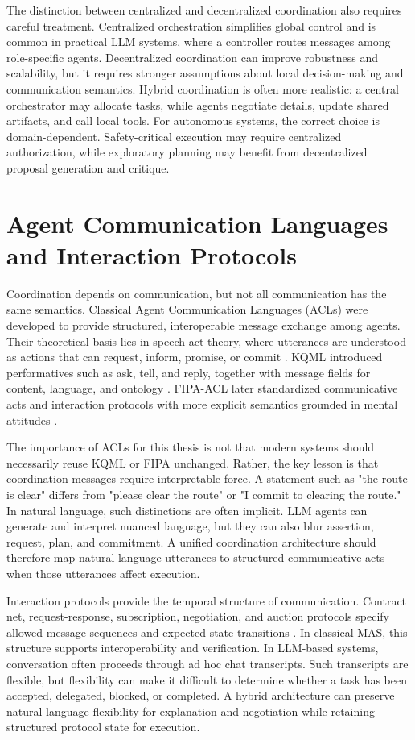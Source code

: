 The distinction between centralized and decentralized coordination also requires careful treatment. Centralized orchestration simplifies global control and is common in practical LLM systems, where a controller routes messages among role-specific agents. Decentralized coordination can improve robustness and scalability, but it requires stronger assumptions about local decision-making and communication semantics. Hybrid coordination is often more realistic: a central orchestrator may allocate tasks, while agents negotiate details, update shared artifacts, and call local tools. For autonomous systems, the correct choice is domain-dependent. Safety-critical execution may require centralized authorization, while exploratory planning may benefit from decentralized proposal generation and critique.

\section{Agent Communication Languages and Interaction Protocols}

Coordination depends on communication, but not all communication has the same semantics. Classical Agent Communication Languages (ACLs) were developed to provide structured, interoperable message exchange among agents. Their theoretical basis lies in speech-act theory, where utterances are understood as actions that can request, inform, promise, or commit \cite{austin1962how,searle1969speech,cohen1990intention}. KQML introduced performatives such as ask, tell, and reply, together with message fields for content, language, and ontology \cite{finin1994kqml,labrou1997proposal}. FIPA-ACL later standardized communicative acts and interaction protocols with more explicit semantics grounded in mental attitudes \cite{fipa2002acl}.

The importance of ACLs for this thesis is not that modern systems should necessarily reuse KQML or FIPA unchanged. Rather, the key lesson is that coordination messages require interpretable force. A statement such as "the route is clear" differs from "please clear the route" or "I commit to clearing the route." In natural language, such distinctions are often implicit. LLM agents can generate and interpret nuanced language, but they can also blur assertion, request, plan, and commitment. A unified coordination architecture should therefore map natural-language utterances to structured communicative acts when those utterances affect execution.

Interaction protocols provide the temporal structure of communication. Contract net, request-response, subscription, negotiation, and auction protocols specify allowed message sequences and expected state transitions \cite{fipa2002acl,jennings2001automated}. In classical MAS, this structure supports interoperability and verification. In LLM-based systems, conversation often proceeds through ad hoc chat transcripts. Such transcripts are flexible, but flexibility can make it difficult to determine whether a task has been accepted, delegated, blocked, or completed. A hybrid architecture can preserve natural-language flexibility for explanation and negotiation while retaining structured protocol state for execution.


